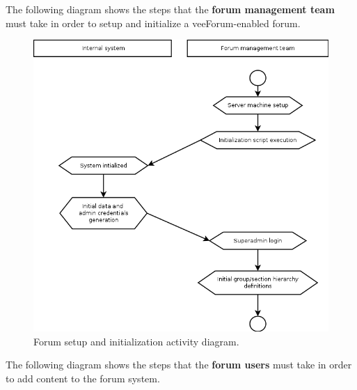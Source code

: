 \documentclass[12pt]{report}
\renewcommand\emph{\textbf}
\begin{document}
                    \newpage

                    The following diagram shows the steps that the \emph{forum management team} must take in order to setup and initialize a veeForum-enabled forum.

                    \begin{figure}[!htb]
                    \caption{Forum setup and initialization activity diagram.}
                    \centering
                    \includegraphics[width=1\textwidth]{uc/a1}
                    \end{figure}

                    \newpage

                    The following diagram shows the steps that the \emph{forum users} must take in order to add content to the forum system.
\end{document}
